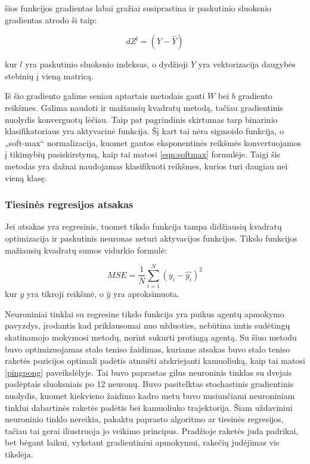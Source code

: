 \documentclass[a4paper, 12pt]{article}
\begin{document}
šios funkcijos gradientas labai gražiai susiprastina ir paskutinio sluoksnio gradientas atrodo ši taip:

\begin{equation}
d Z^{l} = (Y- \hat{Y})
\end{equation}

kur $l$ yra paskutinio sluoksnio indeksas, o dydžioji $Y$ yra vektorizacija daugybės stebinių į vieną matricą.

Iš šio gradiento galime seniau aptartais metodais gauti $W$ bei $b$ gradiento reikšmes. Galima naudoti ir mažiausių kvadratų metodą, tačiau gradientinis nuolydis konverguotų lėčiau.
Taip pat pagrindinis skirtumas tarp binarinio klasifikatoriaus yra aktyvacinė funkcija. Šį kart tai nėra sigmoido funkcija, o „soft-max“ normalizacija, kuomet gautos eksponentinės reikšmės konvertuojamos į tikimybių pasiskirstymą, kaip tai matosi \ref{eqn:softmax} formulėje. Taigi šis metodas yra dažnai naudojamas klasifikuoti reikšmes, kurios turi daugiau nei vieną klasę.

%
\subsubsection{Tiesinės regresijos atsakas}
%

Jei atsakas yra regresinis, tuomet tikslo funkcija tampa didžiausių kvadratų optimizacija ir paskutinis neuronas neturi aktyvacijos funkcijos. Tikslo funkcijos mažiausių kvadratų sumos vidurkio formulė:

\begin{equation}
MSE=\frac{1}{N} \sum_{i=1}^{N}\left(y_i-\hat{y_i}\right)^{2}
\end{equation}
kur $y$ yra tikroji reikšmė, o $\hat{y}$ yra aproksimuota.

Neuroniniai tinklai su regresine tikslo funkcija yra puikus agentų apmokymo pavyzdys, įrodantis kad priklausomai nuo užduoties, nebūtina imtis sudėtingų skatinamojo mokymosi metodų, norint sukurti protingą agentą. Su šiuo metodu buvo optimizuojamas stalo teniso žaidimas, kuriame atsakas buvo stalo teniso raketės pozicijos optimali padėtis atmušti atskriejanti kamuoliuką, kaip tai matosi \ref{pingpong} paveikslėlyje. Tai buvo paprastas gilus neuroninis tinklas su dvejais paslėptais sluoksniais po 12 neuronų. Buvo pasitelktas stochastinis gradientinis nuolydis, kuomet kiekvieno žaidimo kadro metu buvo nusiunčiami neuroniniam tinklui dabartinės raketės padėtis bei kamuoliuko trajektorija. Šiam uždaviniui neuroninio tinklo nereikia, pakaktu paprasto algoritmo ar tiesinės regresijos, tačiau tai gerai iliustruoja jo veikimo principus. Pradžioje raketės juda padrikai, bet bėgant laikui, vykstant gradientiniui apmokymui, rakečių judėjimas vis tikslėja.
\end{document}
